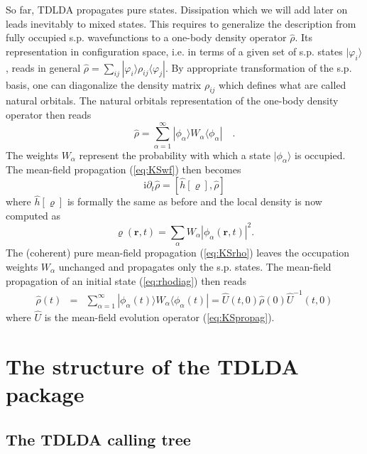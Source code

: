\documentclass[final,1p]{elsarticle}
\newcommand{\I}{\mathrm{i}}
\begin{document}
So far, TDLDA propagates pure states. Dissipation which we will add
later on leads inevitably to mixed states. This requires to generalize
the description from fully occupied s.p. wavefunctions to a one-body
density operator $\hat{\rho}$. Its representation in
  configuration space, i.e. in terms of a given set of s.p. states
  $|\varphi_i\rangle$, reads in general
  $\hat{\rho}=\sum_{ij}|\varphi_i\rangle\rho_{ij}\langle\varphi_j|$.
  By appropriate transformation of the s.p. basis, one can diagonalize
  the density matrix $\rho_{ij}$ which defines what are called natural
  orbitals. The natural orbitals representation of the one-body
  density operator then reads
\begin{equation}
  \hat{\rho}
  =
  \sum_{\alpha=1}^\infty|\phi_\alpha\rangle W_\alpha\langle\phi_\alpha|
  \quad.
\label{eq:rhodiag}
\end{equation}
The weights $W_\alpha$ represent the probability with which a
state $|\phi_\alpha\rangle$ is occupied. The mean-field propagation
(\ref{eq:KSwf}) then becomes
\begin{equation}
  \I\partial_t\hat{\rho}
  =
  \left[\hat{h}[\varrho],\hat{\rho}\right]
\label{eq:KSrho}
\end{equation}
where $\hat{h}[\varrho]$ is formally the same as before and the
local density is now computed as
\begin{equation}
\varrho(\mathbf{r},t)=\sum_\alpha{W}_\alpha|\phi_\alpha(\mathbf{r},t)|^2 .
\label{eq:rhoW}
\end{equation}
The (coherent) pure mean-field propagation (\ref{eq:KSrho})
leaves the occupation weights $W_\alpha$ unchanged and propagates only
the s.p. states.  The mean-field propagation of an initial state
(\ref{eq:rhodiag}) then reads
\begin{eqnarray}
  \hat{\rho}(t)
  &=&
  \sum_{\alpha=1}^\infty
  |\phi_\alpha(t)\rangle W_\alpha\langle\phi_\alpha(t)|
  =
  \hat{U}(t,0)\hat{\rho}(0)\hat{U}^{-1}(t,0)
\label{eq:KSrhoevol}
\end{eqnarray}
where $\hat{U}$ is the mean-field evolution operator (\ref{eq:KSpropag}).


\section{The structure of the TDLDA package}
\label{sec:TDLDAnum}


\subsection{The TDLDA calling tree}
\end{document}
